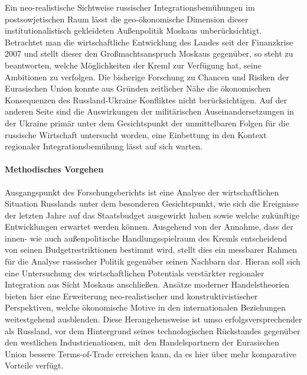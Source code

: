 \documentclass[11pt,a4paper]{article}
\begin{document}
Ein neo-realistische Sichtweise russischer Integrationsbemühungen im postsowjetischen Raum lässt die geo-ökonomische Dimension dieser institutionalistisch gekleideten Außenpolitik Moskaus unberücksichtigt. Betrachtet man die wirtschaftliche Entwicklung des Landes seit der Finanzkrise 2007 und stellt dieser den Großmachtsanspruch Moskaus gegenüber, so steht zu beantworten, welche Möglichkeiten der Kreml zur Verfügung hat, seine Ambitionen zu verfolgen. Die bisherige Forschung zu Chancen und Risiken der Eurasischen Union konnte aus Gründen zeitlicher Nähe die ökonomischen Konsequenzen des Russland-Ukraine Konfliktes nicht berücksichtigen. Auf der anderen Seite sind die Auswirkungen der militärischen Auseinandersetzungen in der Ukraine primär unter dem Gesichtspunkt der unmittelbaren Folgen für die russische Wirtschaft untersucht worden, eine Einbettung in den Kontext regionaler Integrationsbemühung lässt auf sich warten.

\paragraph{Methodisches Vorgehen}
Ausgangspunkt des Forschungsberichts ist eine Analyse der wirtschaftlichen Situation Russlands unter dem besonderen Gesichtspunkt, wie sich die Ereignisse der letzten Jahre auf das Staatsbudget ausgewirkt haben sowie welche zukünftige Entwicklungen erwartet werden können. Ausgehend von der Annahme, dass der innen- wie auch außenpolitische Handlungsspielraum des Kremls entscheidend von seinen Budgetrestriktionen bestimmt wird, stellt dies ein messbarer Rahmen für die Analyse russischer Politik gegenüber seinen Nachbarn dar. Hieran soll sich eine Untersuchung des wirtschaftlichen Potentials verstärkter regionaler Integration aus Sicht Moskaus anschließen. Ansätze moderner Handelstheorien bieten hier eine Erweiterung neo-realistischer und konstruktivistischer Perspektiven, welche ökonomische Motive in den internationalen Beziehungen weitestgehend ausblenden. Diese Herangehensweise ist umso erfolgsversprechender als Russland, vor dem Hintergrund seines technologischen Rückstandes gegenüber den westlichen Industrienationen, mit den Handelspartnern der Eurasischen Union bessere Terms-of-Trade erreichen kann, da es hier über mehr komparative Vorteile verfügt.
\end{document}
